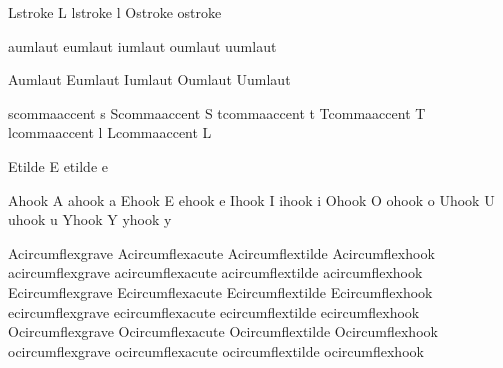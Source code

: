  Lstroke          {L}
 lstroke          {l}
 Ostroke          { } %
 ostroke          { } %

 aumlaut          {\moveaccent{-.1ex}\adiaeresis}
 eumlaut          {\moveaccent{-.1ex}\ediaeresis}
 iumlaut          {\moveaccent{-.1ex}\idiaeresis}
 oumlaut          {\moveaccent{-.1ex}\odiaeresis}
 uumlaut          {\moveaccent{-.1ex}\udiaeresis}

 Aumlaut          {\smashaccent\Adiaeresis}
 Eumlaut          {\smashaccent\Ediaeresis}
 Iumlaut          {\smashaccent\Idiaeresis}
 Oumlaut          {\smashaccent\Odiaeresis}
 Uumlaut          {\smashaccent\Udiaeresis}

 scommaaccent     {\buildtextbottomcomma s}
 Scommaaccent     {\buildtextbottomcomma S}
 tcommaaccent     {\buildtextbottomcomma t}
 Tcommaaccent     {\buildtextbottomcomma T}
 lcommaaccent     {\buildtextbottomcomma l}
 Lcommaaccent     {\buildtextbottomcomma L}

 Etilde           {\buildtextaccent\texttilde E}
 etilde           {\buildtextaccent\texttilde e}

 Ahook               {A}
 ahook               {a}
 Ehook               {E}
 ehook               {e}
 Ihook               {I}
 ihook               {i}
 Ohook               {O}
 ohook               {o}
 Uhook               {U}
 uhook               {u}
 Yhook               {Y}
 yhook               {y}

 Acircumflexgrave    {\Acircumflex}
 Acircumflexacute    {\Acircumflex}
 Acircumflextilde    {\Acircumflex}
 Acircumflexhook     {\Acircumflex}
 acircumflexgrave    {\acircumflex}
 acircumflexacute    {\acircumflex}
 acircumflextilde    {\acircumflex}
 acircumflexhook     {\acircumflex}
 Ecircumflexgrave    {\Ecircumflex}
 Ecircumflexacute    {\Ecircumflex}
 Ecircumflextilde    {\Ecircumflex}
 Ecircumflexhook     {\Ecircumflex}
 ecircumflexgrave    {\ecircumflex}
 ecircumflexacute    {\ecircumflex}
 ecircumflextilde    {\ecircumflex}
 ecircumflexhook     {\ecircumflex}
 Ocircumflexgrave    {\Ocircumflex}
 Ocircumflexacute    {\Ocircumflex}
 Ocircumflextilde    {\Ocircumflex}
 Ocircumflexhook     {\Ocircumflex}
 ocircumflexgrave    {\ocircumflex}
 ocircumflexacute    {\ocircumflex}
 ocircumflextilde    {\ocircumflex}
 ocircumflexhook     {\ocircumflex}

